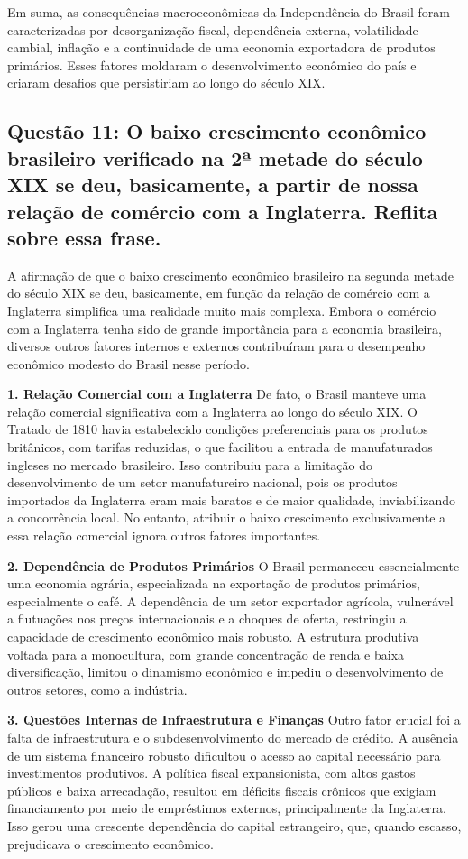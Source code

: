 \documentclass[a4paper,12pt]{article}[abntex2]
\begin{document}
Em suma, as consequências macroeconômicas da Independência do Brasil foram caracterizadas por desorganização fiscal, dependência externa, volatilidade cambial, inflação e a continuidade de uma economia exportadora de produtos primários. Esses fatores moldaram o desenvolvimento econômico do país e criaram desafios que persistiriam ao longo do século XIX.

\subsection{\textbf{Questão 11: O baixo crescimento econômico brasileiro verificado na 2ª metade do século XIX se deu, basicamente, a partir de nossa relação de comércio com a Inglaterra. Reflita sobre essa frase.}}

A afirmação de que o baixo crescimento econômico brasileiro na segunda metade do século XIX se deu, basicamente, em função da relação de comércio com a Inglaterra simplifica uma realidade muito mais complexa. Embora o comércio com a Inglaterra tenha sido de grande importância para a economia brasileira, diversos outros fatores internos e externos contribuíram para o desempenho econômico modesto do Brasil nesse período.

\textbf{1. Relação Comercial com a Inglaterra}
De fato, o Brasil manteve uma relação comercial significativa com a Inglaterra ao longo do século XIX. O Tratado de 1810 havia estabelecido condições preferenciais para os produtos britânicos, com tarifas reduzidas, o que facilitou a entrada de manufaturados ingleses no mercado brasileiro. Isso contribuiu para a limitação do desenvolvimento de um setor manufatureiro nacional, pois os produtos importados da Inglaterra eram mais baratos e de maior qualidade, inviabilizando a concorrência local. No entanto, atribuir o baixo crescimento exclusivamente a essa relação comercial ignora outros fatores importantes.

\textbf{2. Dependência de Produtos Primários}
O Brasil permaneceu essencialmente uma economia agrária, especializada na exportação de produtos primários, especialmente o café. A dependência de um setor exportador agrícola, vulnerável a flutuações nos preços internacionais e a choques de oferta, restringiu a capacidade de crescimento econômico mais robusto. A estrutura produtiva voltada para a monocultura, com grande concentração de renda e baixa diversificação, limitou o dinamismo econômico e impediu o desenvolvimento de outros setores, como a indústria.

\textbf{3. Questões Internas de Infraestrutura e Finanças}
Outro fator crucial foi a falta de infraestrutura e o subdesenvolvimento do mercado de crédito. A ausência de um sistema financeiro robusto dificultou o acesso ao capital necessário para investimentos produtivos. A política fiscal expansionista, com altos gastos públicos e baixa arrecadação, resultou em déficits fiscais crônicos que exigiam financiamento por meio de empréstimos externos, principalmente da Inglaterra. Isso gerou uma crescente dependência do capital estrangeiro, que, quando escasso, prejudicava o crescimento econômico.
\end{document}
